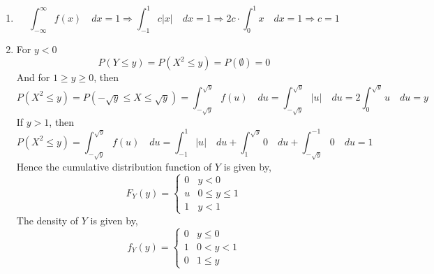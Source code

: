 \begin{solution} \quad                                                       \\
\begin{enumerate}[noitemsep, topsep=0em]
\item
\[
    \int_{-\infty}^\infty f(x) \quad dx = 1
    \Rightarrow \int_{-1}^1 c \vert x \vert \quad dx = 1
    \Rightarrow 2c \cdot \int_{0}^1 x \quad dx = 1
    \Rightarrow c = 1
\] 
\item
For $y < 0$
\[
    P(Y \leq y) = P(X^2 \leq y) = P(\emptyset) = 0
\]
And for $1 \geq y \geq 0$, then
\[
    P(X^2 \leq y) = P(-\sqrt{y} \leq X \leq \sqrt{y})
                  = \int_{-\sqrt{y}}^{\sqrt{y}} f(u) \quad du
                  = \int_{-\sqrt{y}}^{\sqrt{y}} \vert u \vert \quad du
                  = 2 \int_{0}^{\sqrt{y}} u \quad du
                  = y
\]
If $y > 1$, then
\[
    P(X^2 \leq y) = \int_{-\sqrt{y}}^{\sqrt{y}} f(u) \quad du
                  = \int_{-1}^{1} \vert u \vert \quad du +
                    \int_{1}^{\sqrt{y}} 0 \quad du +
                    \int_{-\sqrt{y}}^{-1} 0 \quad du
                  = 1
\]
Hence the cumulative distribution function of $Y$ is given by,
\[
    F_Y(y) = \begin{cases}
        0         & y < 0                                                    \\
        u         & 0 \leq y \leq 1                                          \\
        1         & y < 1         
    \end{cases}
\]
The density of $Y$ is given by,
\[
    f_Y(y) = \begin{cases}
        0         & y \leq 0                                                 \\
        1         & 0 < y < 1                                                \\
        0         & 1 \leq y
    \end{cases}
\]
\end{enumerate}
\end{solution}